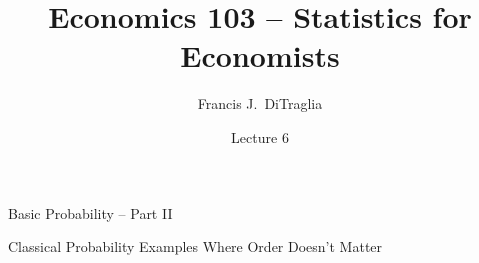 \documentclass[handout]{beamer}
\title[Econ 103]{Economics 103 -- Statistics for Economists}
\author[F. DiTraglia]{Francis J.\ DiTraglia}
\institute{University of Pennsylvania}
\date{Lecture 6}
\begin{document}
 





\begin{frame}[plain]
	\titlepage 
	

\end{frame} 


\begin{frame}

\begin{center}
 \Huge Basic Probability -- Part II
\end{center}

\end{frame}

\begin{frame}

\centering \Huge Classical Probability Examples Where Order Doesn't Matter

\end{frame}
\end{document}
